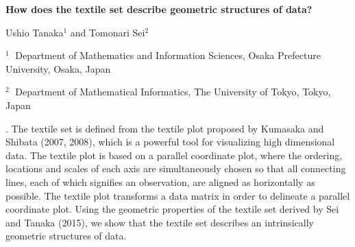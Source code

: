 \documentclass[12pt]{article}
\begin{document}
\begin{flushleft}


{\LARGE\bf How does the textile set describe geometric structures of data?}

\vspace{1.0cm}

Ushio Tanaka$^1$ and Tomonari Sei$^2$

\begin{description}

\item $^1 \;$ Department of Mathematics and Information Sciences, Osaka Prefecture University, Osaka, Japan 

\item $^2 \;$ Department of Mathematical Informatics, The University of Tokyo, Tokyo, Japan 

\end{description}

\end{flushleft}


\vspace{0.75cm}

. 
The textile set is defined from the textile plot proposed by Kumasaka and Shibata (2007, 2008), which is a powerful tool for visualizing high dimensional data. The textile plot is based on a parallel coordinate plot, where the ordering, locations and scales of each axis are simultaneously chosen so that all connecting lines, each of which signifies an observation, are aligned as horizontally as possible. The textile plot transforms a data matrix in order to delineate a parallel coordinate plot. 
Using the geometric properties of the textile set derived by Sei and Tanaka (2015), we show that the textile set describes an intrinsically geometric structures of data.    
\end{document}
